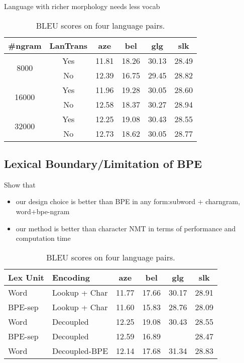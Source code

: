 Language with richer morphology needs less vocab
\begin{table}[h]
    \centering
    \begin{tabular}{cc|cccc}
    \#ngram & LanTrans & aze & bel & glg & slk \\
    \midrule
    \multirow{2}{*}{8000} & Yes & 11.81 & 18.26 & 30.13 & 28.49 \\
         & No & 12.39 & 16.75 & 29.45 & 28.82 \\
    \midrule
    \multirow{2}{*}{16000} & Yes & 11.96 & 19.28 & 30.05 & 28.60 \\
         & No & 12.58 & 18.37 & 30.27 & 28.94 \\
    \midrule
    \multirow{2}{*}{32000} & Yes & 12.25 & 19.08 & 30.43 & 28.55 \\
         & No & 12.73 & 18.62 & 30.05 & 28.77 \\
    \end{tabular}
    \caption{BLEU scores on four language pairs.}
    \label{tab:results}
\end{table}


\subsection{Lexical Boundary/Limitation of BPE}
Show that
\begin{itemize}
    \item our design choice is better than BPE in any form:subword + charngram, word+bpe-ngram
    \item our method is better than character NMT in terms of performance and computation time
\end{itemize}

\begin{table}[h]
    \centering
    \begin{tabular}{ll|cccc}
   Lex Unit & Encoding & aze & bel & glg & slk \\
    \midrule
    Word & Lookup + Char & 11.77 & 17.66 & 30.17 & 28.91 \\
    BPE-sep & Lookup + Char & 11.60 & 15.83 & 28.76 & 28.09 \\
    \midrule
    Word & Decoupled & 12.25 & 19.08 & 30.43 & 28.55 \\
    BPE-sep & Decoupled & 12.59 & 16.89 &  &  28.47 \\
    Word & Decoupled-BPE & 12.14 & 17.68 & 31.34 & 28.83 \\
    \end{tabular}
    \caption{BLEU scores on four language pairs.}
    \label{tab:lex_bound}
\end{table}


